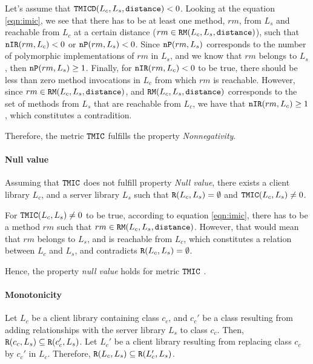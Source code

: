 Let's assume that $\verb|TMICD|(L_c,L_s, \verb|distance|) < 0$. Looking at the equation \ref{eqn:imic}, we see that there has to be at least one method, $rm$, from $L_s$ and reachable from $L_c$ at a certain distance ($rm \in \verb|RM|(L_c,L_s,\verb|distance|)$), such that $\verb|nIR|(rm,L_c) < 0$ or $\verb|nP|(rm, L_s) < 0$. Since $\verb|nP|(rm, L_s)$ corresponds to the number of polymorphic implementations of $rm$ in $L_s$, and we know that $rm$ belongs to $L_s$, then $\verb|nP|(rm, L_s) \geq 1$. Finally, for $\verb|nIR|(rm,L_c) < 0$ to be true, there should be less than zero method invocations in $L_c$ from which $rm$ is reachable. However, since $rm \in \verb|RM|(L_c,L_s,\verb|distance|)$, and $\verb|RM|(L_c,L_s,\verb|distance|)$ corresponds to the set of methods from $L_s$ that are reachable from $L_c$, we have that $\verb|nIR|(rm,L_c) \geq 1$, which constitutes a contradition.

Therefore, the metric $\verb|TMIC|$ fulfills the property \textit{Nonnegativity}.

\paragraph{Null value}
Assuming that $\verb|TMIC|$ does not fulfill property \textit{Null value}, there exists a client library $L_c$, and a server library $L_s$ such that $\verb|R|(L_c, L_s) = \emptyset$ and $\verb|TMIC|(L_c, L_s) \neq 0$.

For $\verb|TMIC|(L_c, L_s) \neq 0$ to be true, according to equation \ref{eqn:imic}, there has to be a method $rm$ such that  $rm \in \verb|RM|(L_c,L_s,\verb|distance|)$. However, that would mean that $rm$ belongs to $L_s$, and is reachable from $L_c$, which constitutes a relation between $L_c$ and $L_s$, and contradicts $\verb|R|(L_c, L_s) = \emptyset$.

Hence, the property \textit{null value} holds for metric $\verb|TMIC|$ .

\paragraph{Monotonicity}
Let $L_c$ be a client library containing class $c_c$, and $c_c'$ be a class resulting from adding relationships with the server library $L_s$ to class $c_c$. Then, $\verb|R|(c_c, L_s) \subseteq \verb|R|(c_c', L_s)$. Let $L_c'$ be a client library resulting from replacing class $c_c$ by $c_c'$ in $L_c$. Therefore, $\verb|R|(L_c, L_s) \subseteq \verb|R|(L_c', L_s)$.

